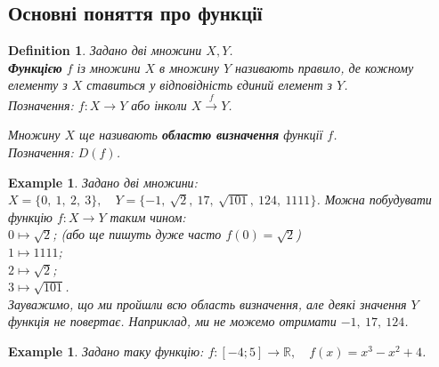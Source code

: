\documentclass[a4paper, 14pt]{article}
\theoremstyle{theoremdd}
\theoremstyle{theoremdd}
\newtheorem{definition}[theorem]{Definition}
\theoremstyle{theoremdd}
\theoremstyle{theoremdd}
\newtheorem{example}[theorem]{Example}
\theoremstyle{theoremdd}
\theoremstyle{theoremdd}
\theoremstyle{theoremdd}
\theoremstyle{theoremdd}
\begin{document}
	\subsection{Основні поняття про функції}
	\begin{definition}
	Задано дві множини $X,Y$.\\
	\textbf{Функцією} $f$ із множини $X$ в множину $Y$ називають правило, де кожному елементу з $X$ ставиться у відповідність єдиний елемент з $Y$.\\
	Позначення: $f \colon X \to Y$ або інколи $X \xrightarrow{f} Y$.
	\begin{figure}[H]
\end{figure}
	Множину $X$ ще називають \textbf{областю визначення} функції $f$.\\
	Позначення: $D(f)$.
	\end{definition}
	
	\begin{example}
	Задано дві множини: $X = \{0,\ 1,\ 2,\ 3 \}, \quad Y = \{-1,\ \sqrt{2},\ 17,\ \sqrt{101},\ 124,\ 1111\}$. Можна побудувати функцію $f \colon X \to Y$ таким чином:\\
	$0 \mapsto \sqrt{2}$; \quad (або ще пишуть дуже часто $f(0) = \sqrt{2}$)\\
	$1 \mapsto 1111$;\\
	$2 \mapsto \sqrt{2}$;\\
	$3 \mapsto \sqrt{101}$.\\
	Зауважимо, що ми пройшли всю область визначення, але деякі значення $Y$ функція не повертає. Наприклад, ми не можемо отримати $-1,\ 17,\ 124$.
	\end{example}
	
	\begin{example}
	Задано таку функцію: $f \colon [-4; 5] \to \mathbb{R}, \quad f(x) = x^3-x^2+4$.
	\end{example}
	
\end{document}
